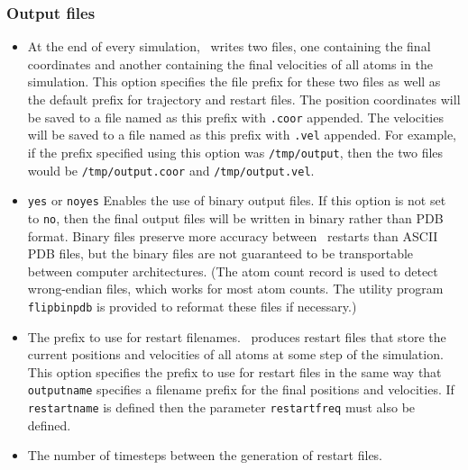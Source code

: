 \subsubsection{Output files}

\begin{itemize}
\item
{}
{\label{param:outputname}
At the end of every simulation, \NAMD\ writes two files, one 
containing the final coordinates and another containing 
the final velocities of all atoms in the simulation.  
This option specifies the file prefix for these two files as
well as the default prefix for trajectory and restart files.  
The position coordinates will be saved to a file named as this prefix 
with {\tt .coor} appended.  
The velocities will be saved to a file 
named as this prefix with {\tt .vel} appended.  
For example, 
if the prefix specified using this option was {\tt /tmp/output}, 
then the two files 
would be {\tt /tmp/output.coor} and {\tt /tmp/output.vel}.}

\item
{}
{{\tt yes} or {\tt no}}{{\tt yes}}
{
Enables the use of binary output files.  
If this option is not set to {\tt no}, then the final output files 
will be written in binary rather than PDB format.  
Binary files preserve more accuracy between \NAMD\ restarts 
than ASCII PDB files, 
but the binary files are not guaranteed to be transportable 
between computer architectures. (The atom count record is used
to detect wrong-endian files, which works for most atom counts.
The utility program {\tt flipbinpdb} is provided
to reformat these files if necessary.)
}

\item
{}
{
The prefix to use for restart filenames.  
\NAMD\ produces restart files 
that store the current positions and velocities of all 
atoms at some step of the simulation.  
This option specifies the prefix to use for restart 
files in the same way that {\tt outputname} 
specifies a filename prefix for the final
positions and velocities.  
If {\tt restartname} is defined then
the parameter {\tt restartfreq} must also be defined.}

\item
{}
{
The number of timesteps between the generation of restart files.  
}


\end{itemize}
